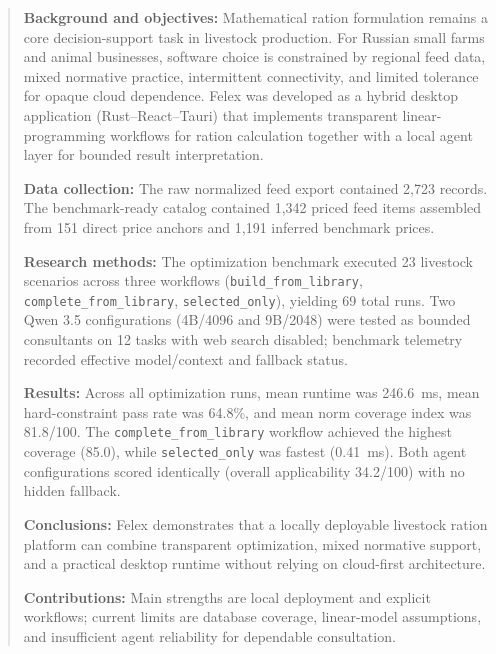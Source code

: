 \documentclass[a4paper,fleqn]{cas-dc}
\begin{document}
\begin{abstract}
\textbf{Background and objectives:} Mathematical ration formulation remains a core decision-support task in livestock production. For Russian small farms and animal businesses, software choice is constrained by regional feed data, mixed normative practice, intermittent connectivity, and limited tolerance for opaque cloud dependence. Felex was developed as a hybrid desktop application (Rust--React--Tauri) that implements transparent linear-programming workflows for ration calculation together with a local agent layer for bounded result interpretation.

\textbf{Data collection:} The raw normalized feed export contained 2,723 records. The benchmark-ready catalog contained 1,342 priced feed items assembled from 151 direct price anchors and 1,191 inferred benchmark prices.

\textbf{Research methods:} The optimization benchmark executed 23 livestock scenarios across three workflows (\texttt{build\_from\_library}, \texttt{complete\_from\_library}, \texttt{selected\_only}), yielding 69 total runs. Two Qwen 3.5 configurations (4B/4096 and 9B/2048) were tested as bounded consultants on 12 tasks with web search disabled; benchmark telemetry recorded effective model/context and fallback status.

\textbf{Results:} Across all optimization runs, mean runtime was 246.6~ms, mean hard-constraint pass rate was 64.8\%, and mean norm coverage index was 81.8/100. The \texttt{complete\_from\_library} workflow achieved the highest coverage (85.0), while \texttt{selected\_only} was fastest (0.41~ms). Both agent configurations scored identically (overall applicability 34.2/100) with no hidden fallback.

\textbf{Conclusions:} Felex demonstrates that a locally deployable livestock ration platform can combine transparent optimization, mixed normative support, and a practical desktop runtime without relying on cloud-first architecture.

\textbf{Contributions:} Main strengths are local deployment and explicit workflows; current limits are database coverage, linear-model assumptions, and insufficient agent reliability for dependable consultation.
\end{abstract}

\end{document}
